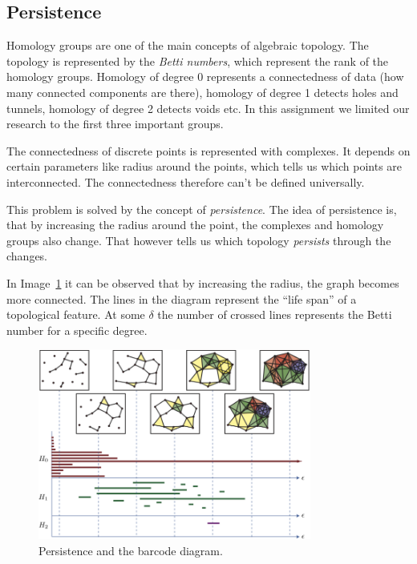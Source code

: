 \documentclass[11pt]{article}
\begin{document}
\subsection{Persistence}

Homology groups are one of the main concepts of algebraic topology. The topology is represented by the \emph{Betti numbers}, which represent the rank of the homology groups. Homology of degree 0 represents a connectedness of data (how many connected components are there), homology of degree 1 detects holes and tunnels, homology of degree 2 detects voids etc. In this assignment we limited our research to the first three important groups.

The connectedness of discrete points is represented with complexes. It depends on certain parameters like radius around the points, which tells us which points are interconnected. The connectedness therefore can't be defined universally.

This problem is solved by the concept of \emph{persistence}. The idea of persistence is, that by increasing the radius around the point, the complexes and homology groups also change. That however tells us which topology \emph{persists} through the changes.

In Image~\ref{homo} it can be observed that by increasing the radius, the graph becomes more connected. The lines in the diagram represent the ``life span'' of a topological feature. At some $\delta$ the number of crossed lines represents the Betti number for a specific degree. \cite{persist}

\begin{figure}[htb]
    \centering
    \includegraphics[width=0.8\textwidth]{homo.png}
    \caption{Persistence and the barcode diagram.}
    \label{homo}
\end{figure}
\end{document}
